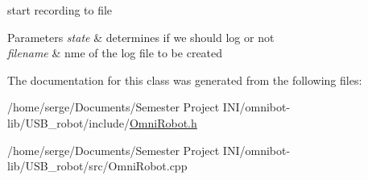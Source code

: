start recording to file 


\begin{DoxyParams}{Parameters}
{\em state} & determines if we should log or not \\
\hline
{\em filename} & nme of the log file to be created \\
\hline
\end{DoxyParams}


The documentation for this class was generated from the following files\+:\begin{DoxyCompactItemize}
\item 
/home/serge/\+Documents/\+Semester Project I\+N\+I/omnibot-\/lib/\+U\+S\+B\+\_\+robot/include/\hyperlink{_omni_robot_8h}{Omni\+Robot.\+h}\item 
/home/serge/\+Documents/\+Semester Project I\+N\+I/omnibot-\/lib/\+U\+S\+B\+\_\+robot/src/Omni\+Robot.\+cpp\end{DoxyCompactItemize}
